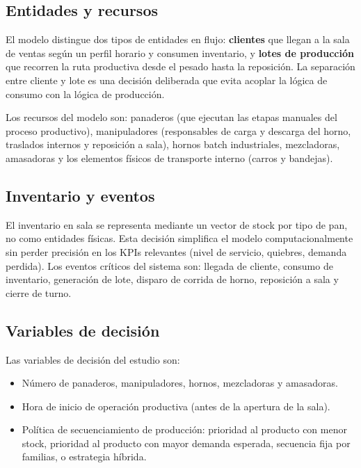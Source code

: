 \documentclass[12pt]{article}
\begin{document}
\subsection{Entidades y recursos}

El modelo distingue dos tipos de entidades en flujo: \textbf{clientes} que llegan a la sala de ventas según un perfil horario y consumen inventario, y \textbf{lotes de producción} que recorren la ruta productiva desde el pesado hasta la reposición. La separación entre cliente y lote es una decisión deliberada que evita acoplar la lógica de consumo con la lógica de producción.

Los recursos del modelo son: panaderos (que ejecutan las etapas manuales del proceso productivo), manipuladores (responsables de carga y descarga del horno, traslados internos y reposición a sala), hornos batch industriales, mezcladoras, amasadoras y los elementos físicos de transporte interno (carros y bandejas).

\subsection{Inventario y eventos}

El inventario en sala se representa mediante un vector de stock por tipo de pan, no como entidades físicas. Esta decisión simplifica el modelo computacionalmente sin perder precisión en los KPIs relevantes (nivel de servicio, quiebres, demanda perdida). Los eventos críticos del sistema son: llegada de cliente, consumo de inventario, generación de lote, disparo de corrida de horno, reposición a sala y cierre de turno.

\subsection{Variables de decisión}

Las variables de decisión del estudio son:
\begin{itemize}
  \item Número de panaderos, manipuladores, hornos, mezcladoras y amasadoras.
  \item Hora de inicio de operación productiva (antes de la apertura de la sala).
  \item Política de secuenciamiento de producción: prioridad al producto con menor stock, prioridad al producto con mayor demanda esperada, secuencia fija por familias, o estrategia híbrida.
\end{itemize}
\end{document}

